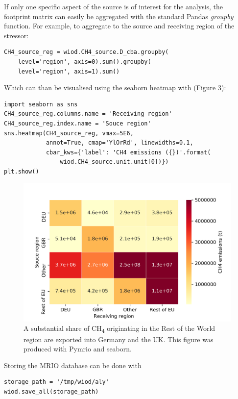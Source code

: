 \documentclass{jors}
\begin{document}
{If only one specific aspect of the source is of interest for the analysis, the footprint matrix can easily be aggregated with the standard Pandas {\it groupby} function.
For example, to aggregate to the source and receiving region of the stressor:

\begin{lstlisting}
CH4_source_reg = wiod.CH4_source.D_cba.groupby(
    level='region', axis=0).sum().groupby(
    level='region', axis=1).sum()
\end{lstlisting}

Which can than be visualised using the seaborn heatmap \cite{waskom2017} with (Figure 3):

\begin{lstlisting}
import seaborn as sns
CH4_source_reg.columns.name = 'Receiving region'
CH4_source_reg.index.name = 'Souce region'
sns.heatmap(CH4_source_reg, vmax=5E6, 
            annot=True, cmap='YlOrRd', linewidths=0.1,
            cbar_kws={'label': 'CH4 emissions ({})'.format(
                wiod.CH4_source.unit.unit[0])})
plt.show()
\end{lstlisting}

  \begin{figure}[h!]
      \includegraphics[width=.9\textwidth]{./fig/airch4_source_reg.png}
      \caption{
      A substantial share of CH\textsubscript{4} originating in the Rest of the World region are exported into Germany and the UK.
      This figure was produced with Pymrio and seaborn. }
      \end{figure}


Storing the MRIO database can be done with 

\begin{lstlisting}
storage_path = '/tmp/wiod/aly'
wiod.save_all(storage_path)
\end{lstlisting}

}
\end{document}
